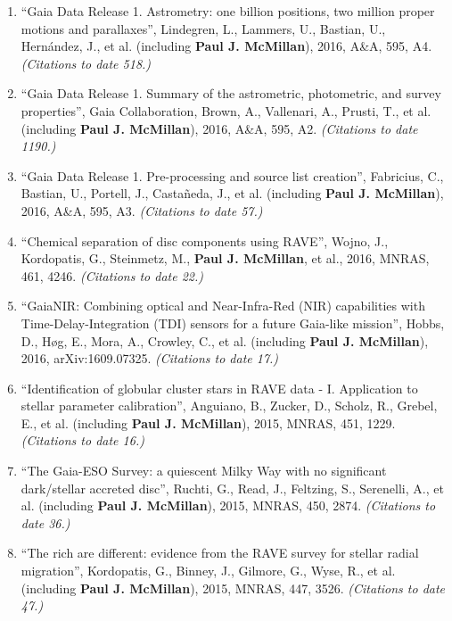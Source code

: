 \documentclass{resume}
\begin{document}
\begin{enumerate}
\item ``Gaia Data Release 1. Astrometry: one billion positions, two million proper motions and parallaxes'', Lindegren, L., Lammers, U., Bastian, U., Hern\'andez, J., et al. (including \textbf{Paul J. McMillan}), 2016, A\&A, 595, A4. \textit{(Citations to date 518.)}

\item ``Gaia Data Release 1. Summary of the astrometric, photometric, and survey properties'', Gaia Collaboration, Brown, A., Vallenari, A., Prusti, T., et al. (including \textbf{Paul J. McMillan}), 2016, A\&A, 595, A2. \textit{(Citations to date 1190.)}

\item ``Gaia Data Release 1. Pre-processing and source list creation'', Fabricius, C., Bastian, U., Portell, J., Casta\~neda, J., et al. (including \textbf{Paul J. McMillan}), 2016, A\&A, 595, A3. \textit{(Citations to date 57.)}

\item ``Chemical separation of disc components using RAVE'', Wojno, J., Kordopatis, G., Steinmetz, M., \textbf{Paul J. McMillan}, et al., 2016, MNRAS, 461, 4246. \textit{(Citations to date 22.)}

\item ``GaiaNIR: Combining optical and Near-Infra-Red (NIR) capabilities with Time-Delay-Integration (TDI) sensors for a future Gaia-like mission'', Hobbs, D., H{\o}g, E., Mora, A., Crowley, C., et al. (including \textbf{Paul J. McMillan}), 2016, arXiv:1609.07325. \textit{(Citations to date 17.)}

\item ``Identification of globular cluster stars in RAVE data - I. Application to stellar parameter calibration'', Anguiano, B., Zucker, D., Scholz, R., Grebel, E., et al. (including \textbf{Paul J. McMillan}), 2015, MNRAS, 451, 1229. \textit{(Citations to date 16.)}

\item ``The Gaia-ESO Survey: a quiescent Milky Way with no significant dark/stellar accreted disc'', Ruchti, G., Read, J., Feltzing, S., Serenelli, A., et al. (including \textbf{Paul J. McMillan}), 2015, MNRAS, 450, 2874. \textit{(Citations to date 36.)}

\item ``The rich are different: evidence from the RAVE survey for stellar radial migration'', Kordopatis, G., Binney, J., Gilmore, G., Wyse, R., et al. (including \textbf{Paul J. McMillan}), 2015, MNRAS, 447, 3526. \textit{(Citations to date 47.)}


\end{enumerate}
\end{document}
